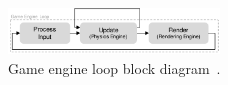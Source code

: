 \documentclass[runningheads,twocolumn,a4paper,10pt]{llncs}
\begin{document}
\begin{figure}[h]
\centering
\includegraphics[width=0.5\textwidth]{Other/Figures/GameEngineLoopv2.pdf}
\caption{Game engine loop block diagram~\cite{GameProgPatternsBook}.}
\label{GameEngineLoopDiagram}
\end{figure}






% 


\end{document}
